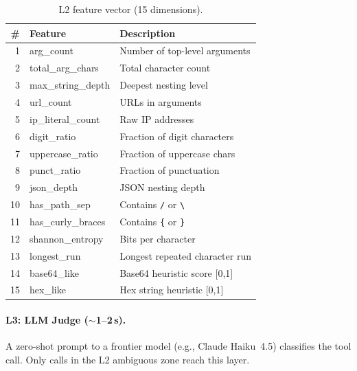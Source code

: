 \documentclass[sigconf]{acmart}
\begin{document}
\begin{table}[t]
\centering
\footnotesize
\caption{L2 feature vector (15 dimensions).}
\vspace{-0.1in}
\label{tab:features}
\setlength{\tabcolsep}{3pt}
\begin{tabular}{rll}
\toprule
\# & Feature & Description \\
\midrule
1 & arg\_count & Number of top-level arguments \\
2 & total\_arg\_chars & Total character count \\
3 & max\_string\_depth & Deepest nesting level \\
4 & url\_count & URLs in arguments \\
5 & ip\_literal\_count & Raw IP addresses \\
6 & digit\_ratio & Fraction of digit characters \\
7 & uppercase\_ratio & Fraction of uppercase chars \\
8 & punct\_ratio & Fraction of punctuation \\
9 & json\_depth & JSON nesting depth \\
10 & has\_path\_sep & Contains \texttt{/} or \texttt{\textbackslash} \\
11 & has\_curly\_braces & Contains \texttt{\{} or \texttt{\}} \\
12 & shannon\_entropy & Bits per character \\
13 & longest\_run & Longest repeated character run \\
14 & base64\_like & Base64 heuristic score [0,1] \\
15 & hex\_like & Hex string heuristic [0,1] \\
\bottomrule
\end{tabular}
\vspace{-0.15in}
\end{table}

\paragraph{L3: LLM Judge ($\sim$1--2\,s).}
A zero-shot prompt to a frontier model (e.g., Claude Haiku~4.5) classifies the tool call. Only calls in the L2 ambiguous zone reach this layer.
\end{document}
